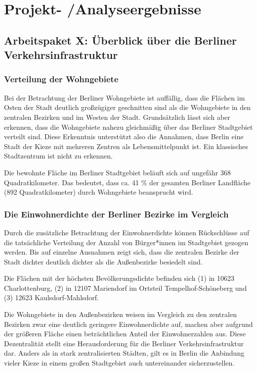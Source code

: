 \newpage
\section{Projekt- /Analyseergebnisse} \label{ergebnisse}

\subsection{Arbeitspaket X: Überblick über die Berliner Verkehrsinfrastruktur}

\subsubsection{Verteilung der Wohngebiete}

Bei der Betrachtung der Berliner Wohngebiete ist auffällig, dass die Flächen im Osten der Stadt deutlich großzügiger geschnitten sind als die Wohngebiete in den zentralen Bezirken und im Westen der Stadt. Grundsätzlich lässt sich aber erkennen, dass die Wohngebiete nahezu gleichmäßig über das Berliner Stadtgebiet verteilt sind. Diese Erkenntnis unterstützt also die Annahmen, dass Berlin eine Stadt der Kieze mit mehreren Zentren als Lebensmittelpunkt ist. Ein klassisches Stadtzentrum ist nicht zu erkennen.

Die bewohnte Fläche im Berliner Stadtgebiet beläuft sich auf ungefähr 368 Quadratkilometer. Das bedeutet, dass ca. 41 \% der gesamten Berliner Landfläche (892 Quadratkilometer) durch Wohngebiete beansprucht wird.

\subsubsection{Die Einwohnerdichte der Berliner Bezirke im Vergleich}

Durch die zusätzliche Betrachtung der Einwohnerdichte können Rückschlüsse auf die tatsächliche Verteilung der Anzahl von Bürger*innen im Stadtgebiet gezogen werden. Bis auf einzelne Ausnahmen zeigt sich, dass die zentralen Bezirke der Stadt dichter deutlich dichter als die Außenbezirke besiedelt sind.

Die Flächen mit der höchsten Bevölkerungsdichte befinden sich (1) in 10623 Charlottenburg, (2) in 12107 Mariendorf im Ortsteil Tempelhof-Schöneberg und (3) 12623 Kaulsdorf-Mahlsdorf.


Die Wohngebiete in den Außenbezirken weisen im Vergleich zu den zentralen Bezirken zwar eine deutlich geringere Einwohnerdichte auf, machen aber aufgrund der größeren Fläche einen beträchtlichen Anteil der Einwohnerzahlen aus. Diese Dezentralität stellt eine Herausforderung für die Berliner Verkehrsinfrastruktur dar. Anders als in stark zentralisierten Städten, gilt es in Berlin die Anbindung vieler Kieze in einem großen Stadtgebiet auch untereinander sicherzustellen.



